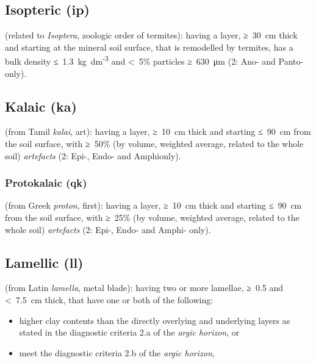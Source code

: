 \documentclass[
  letterpaper,
  DIV=11,
  numbers=noendperiod]{scrreprt}
\providecommand{\tightlist}{%
  \setlength{\itemsep}{0pt}\setlength{\parskip}{0pt}}\usepackage{longtable,booktabs,array}
\begin{document}
\hypertarget{isopteric-ip}{%
\subsection{Isopteric (ip)}\label{isopteric-ip}}

(related to \emph{Isoptera}, zoologic order of termites): having a
layer, ≥~30~cm thick and starting at the mineral soil surface, that is
remodelled by termites, has a bulk density
≤~1.3~kg~dm\textsuperscript{-3} and \textless~5\% particles ≥~630~μm (2:
Ano- and Panto- only).

\hypertarget{kalaic-ka}{%
\subsection{Kalaic (ka)}\label{kalaic-ka}}

(from Tamil \emph{kalai}, art): having a layer, ≥~10~cm thick and
starting ≤~90~cm from the soil surface, with ≥~50\% (by volume, weighted
average, related to the whole soil) \emph{artefacts} (2: Epi-, Endo- and
Amphionly).

\hypertarget{protokalaic-qk}{%
\subsubsection{Protokalaic (qk)}\label{protokalaic-qk}}

(from Greek \emph{proton}, first): having a layer, ≥~10~cm thick and
starting ≤~90~cm from the soil surface, with ≥~25\% (by volume, weighted
average, related to the whole soil) \emph{artefacts} (2: Epi-, Endo- and
Amphi- only).

\hypertarget{lamellic-ll}{%
\subsection{Lamellic (ll)}\label{lamellic-ll}}

(from Latin \emph{lamella}, metal blade): having two or more lamellae,
≥~0.5 and \textless~7.5~cm thick, that have one or both of the
following:

\begin{itemize}
\tightlist
\item
  higher clay contents than the directly overlying and underlying layers
  as stated in the diagnostic criteria 2.a of the \emph{argic horizon},
  or
\item
  meet the diagnostic criteria 2.b of the \emph{argic horizon},
\end{itemize}
\end{document}
